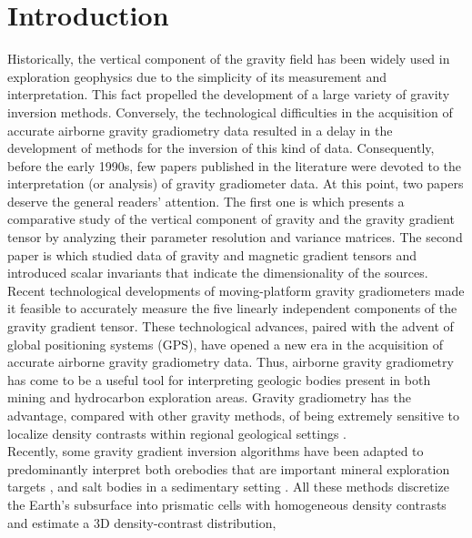 \section{Introduction}

Historically, the vertical component of the gravity field has been widely
used in exploration geophysics due to the simplicity of its measurement and
interpretation.
This fact propelled the development of a large variety of gravity
inversion methods.
Conversely, the technological difficulties in the acquisition of
accurate airborne gravity gradiometry data resulted in a delay in the
development of methods for the inversion of this kind of data.
Consequently, before the early 1990s, few papers published in the literature
were devoted to the interpretation (or analysis) of gravity gradiometer data.
At this point, two papers deserve the general readers' attention.
The first one is \citet{vasco} which presents a comparative study of the
vertical
component of gravity and the gravity gradient tensor by analyzing their
parameter resolution and variance matrices.
The second paper is \citet{pedersen} which studied data of gravity
and magnetic gradient tensors and introduced scalar invariants that indicate the
dimensionality of the sources.
\\ \indent 
Recent technological developments of moving-platform gravity gradiometers made
it feasible to accurately measure the five linearly independent components
of the gravity gradient tensor.
These technological advances, paired with the advent of global positioning
systems (GPS), have opened a new era in the acquisition of accurate airborne
gravity gradiometry data.
Thus, airborne gravity gradiometry has come to be a useful tool for interpreting
geologic bodies present in both mining and hydrocarbon exploration areas.
Gravity gradiometry has the advantage, compared with other gravity methods,
of being extremely sensitive to localize density contrasts within regional
geological settings \citep{zhdanov10b}.
\\ \indent 
Recently, some gravity gradient inversion algorithms have been adapted to
predominantly interpret both orebodies that are important mineral
exploration targets \citep[e.g.,][]{li, zhdanov04, martinez, wilson},
and salt bodies in a sedimentary setting \citep[e.g.,][]{jorgensen, routh}.
All these methods discretize the Earth's subsurface into prismatic cells with
homogeneous density contrasts and estimate a 3D density-contrast distribution,
